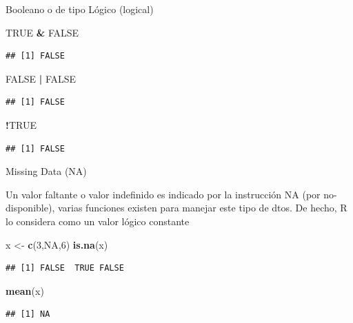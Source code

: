 \documentclass[ignorenonframetext,]{beamer}
\newenvironment{Shaded}{\begin{snugshade}}{\end{snugshade}}
\newcommand{\KeywordTok}[1]{\textcolor[rgb]{0.13,0.29,0.53}{\textbf{#1}}}
\newcommand{\DecValTok}[1]{\textcolor[rgb]{0.00,0.00,0.81}{#1}}
\newcommand{\StringTok}[1]{\textcolor[rgb]{0.31,0.60,0.02}{#1}}
\newcommand{\OtherTok}[1]{\textcolor[rgb]{0.56,0.35,0.01}{#1}}
\newcommand{\OperatorTok}[1]{\textcolor[rgb]{0.81,0.36,0.00}{\textbf{#1}}}
\newcommand{\NormalTok}[1]{#1}
\begin{document}
\begin{frame}[fragile]{Booleano o de tipo Lógico (logical)}

\begin{Shaded}
\begin{Highlighting}[]
\OtherTok{TRUE} \OperatorTok{&}\StringTok{ }\OtherTok{FALSE}
\end{Highlighting}
\end{Shaded}

\begin{verbatim}
## [1] FALSE
\end{verbatim}

\begin{Shaded}
\begin{Highlighting}[]
\OtherTok{FALSE} \OperatorTok{|}\StringTok{ }\OtherTok{FALSE}
\end{Highlighting}
\end{Shaded}

\begin{verbatim}
## [1] FALSE
\end{verbatim}

\begin{Shaded}
\begin{Highlighting}[]
\OperatorTok{!}\OtherTok{TRUE}
\end{Highlighting}
\end{Shaded}

\begin{verbatim}
## [1] FALSE
\end{verbatim}

\end{frame}

\begin{frame}[fragile]{Missing Data (NA)}

Un valor faltante o valor indefinido es indicado por la instrucción NA
(por no-disponible), varias funciones existen para manejar este tipo de
dtos. De hecho, R lo considera como un valor lógico constante

\begin{Shaded}
\begin{Highlighting}[]
\NormalTok{x <-}\StringTok{ }\KeywordTok{c}\NormalTok{(}\DecValTok{3}\NormalTok{,}\OtherTok{NA}\NormalTok{,}\DecValTok{6}\NormalTok{)}
\KeywordTok{is.na}\NormalTok{(x)}
\end{Highlighting}
\end{Shaded}

\begin{verbatim}
## [1] FALSE  TRUE FALSE
\end{verbatim}

\begin{Shaded}
\begin{Highlighting}[]
\KeywordTok{mean}\NormalTok{(x)}
\end{Highlighting}
\end{Shaded}

\begin{verbatim}
## [1] NA
\end{verbatim}

\end{frame}
\end{document}
